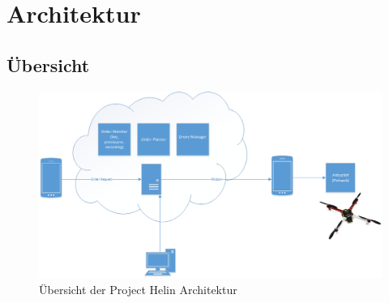 \chapter{Architektur}

\section{Übersicht}



\begin{figure}[h]
	\includegraphics[width=1.0\textwidth]{images/Overview-Diagram.png}
	\caption{Übersicht der Project Helin Architektur }
	\label{fig:architecture-overview}
\end{figure}